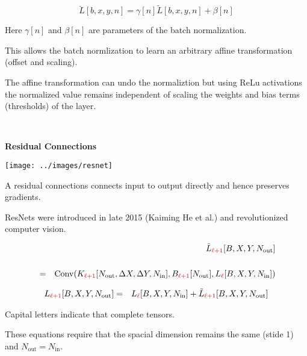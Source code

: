 {

$$\breve{L}[b,x,y,n] = \gamma[n] \tilde{L}[b,x,y,n] + \beta[n]$$

\vfill
Here $\gamma[n]$ and $\beta[n]$ are parameters of the batch normalization.

\vfill
This allows the batch normlization to learn an arbitrary affine transformation (offset and scaling).

\vfill
The affine transformation can undo the normaliztion but using ReLu activations the normalized value remains independent of scaling the weights and
bias terms (thresholds) of the layer.

\vfill
\eject
~ \vfill
\centerline{\bf Residual Connections}
\vfill
\vfill


\vfill
\texttt{[image: ../images/resnet]}
\hfill \begin{minipage}[b]{4in}
  A residual connections connects input to output directly and hence preserves gradients.

  \bigskip
  ResNets were introduced in late 2015 (Kaiming He et al.) and revolutionized computer vision.
\end{minipage}

\newcommand{\nin}{n_{\mathrm{in}}}
\newcommand{\nout}{n_{\mathrm{out}}}

\medskip
\begin{eqnarray*}
& & \tilde{L}_{\color{red} \ell+1}[B,X,Y,N_{\mathrm{out}}] \\
\\
& = & \mathrm{Conv}(K_{\color{red} \ell+1}[N_{\mathrm{out}},\Delta X,\Delta Y,N_{\mathrm{in}}],B_{\color{red} \ell+1}[N_{\mathrm{out}}],L_{\color{red} \ell}[B,X,Y,N_{\mathrm{in}}])
\end{eqnarray*}

\begin{eqnarray*}
L_{\color{red} \ell+1}[B,X,Y,N_{\mathrm{out}}] & = & L_{\color{red}\ell}[B,X,Y,N_{\mathrm{in}}] + \tilde{L}_{\color{red} \ell+1}[B,X,Y,N_{\mathrm{out}}]
\end{eqnarray*}

\vfill Capital letters indicate that complete tensors.

\vfill These equations require that the spacial dimension remains the same (stide 1) and $N_{\mathrm{out}} = N_{\mathrm{in}}$.


}
